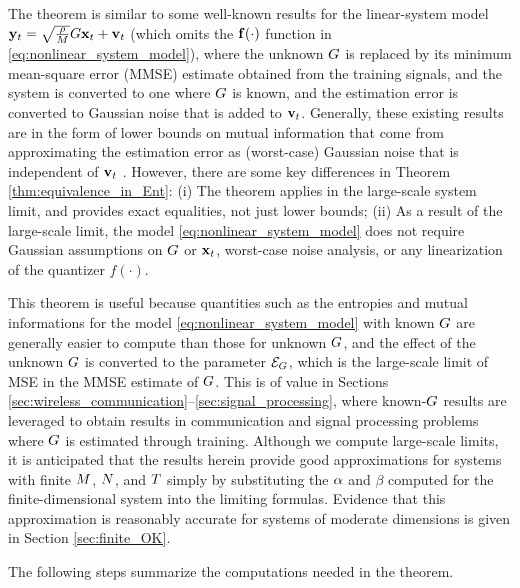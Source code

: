 \documentclass[12pt, draftclsnofoot,journal,onecolumn]{IEEEtran}
\begin{document}
The theorem is similar to some well-known results for the linear-system model ${\mathbf{y}}_t=\sqrt{\frac{\rho}{M}}G{\mathbf{x}}_t+{\mathbf{v}}_t$ (which omits the ${\mathbf{f}}(\cdot)$ function in \eqref{eq:nonlinear_system_model}), where the unknown $G$ is replaced by its minimum mean-square error (MMSE) estimate obtained from the training signals, and the system is converted to one where $G$ is known, and the estimation error is converted to Gaussian noise that is added to ${\mathbf{v}}_t$.  Generally, these existing results are in the form of lower bounds on mutual information that come from approximating the estimation error as (worst-case) Gaussian noise that is independent of ${\mathbf{v}}_t$  \cite{hassibi2003much,medard2000effect}.  However, there are some key differences in Theorem \ref{thm:equivalence_in_Ent}: (i) The theorem applies in the large-scale system limit, and provides exact equalities, not just lower bounds; (ii) As a result of the large-scale limit, the model \eqref{eq:nonlinear_system_model} does not require Gaussian assumptions on $G$ or ${\mathbf{x}}_t$, worst-case noise analysis, or any linearization of the quantizer $f(\cdot)$.


This theorem is useful because quantities such as the entropies and mutual informations for the model \eqref{eq:nonlinear_system_model} with known $G$ are generally easier to compute than those for unknown $G$, and the effect of the unknown $G$ is converted to the parameter ${\mathcal{E}}_{G}$, which is the large-scale limit of MSE in the MMSE estimate of $G$.  This is of value in Sections \ref{sec:wireless_communication}--\ref{sec:signal_processing}, where known-$G$ results are leveraged to obtain results in communication and signal processing problems where $G$ is estimated through training.  
Although we compute large-scale limits, it is anticipated that the results herein provide good approximations for systems with finite $M$, $N$, and $T$ simply by substituting the $\alpha$ and $\beta$ computed for the finite-dimensional system into the limiting formulas.  Evidence that this approximation is reasonably accurate for systems of moderate dimensions is given in Section \ref{sec:finite_OK}. 

The following steps summarize the computations needed in the theorem.
\end{document}
